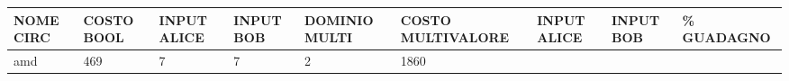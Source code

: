 \documentclass[italian,]{book}
\begin{document}
\begin{longtable}[]{@{}lllllllll@{}}
\toprule
\begin{minipage}[b]{0.07\columnwidth}\raggedright
NOME CIRC\strut
\end{minipage} & \begin{minipage}[b]{0.11\columnwidth}\raggedright
COSTO BOOL\strut
\end{minipage} & \begin{minipage}[b]{0.08\columnwidth}\raggedright
INPUT ALICE\strut
\end{minipage} & \begin{minipage}[b]{0.07\columnwidth}\raggedright
INPUT BOB\strut
\end{minipage} & \begin{minipage}[b]{0.09\columnwidth}\raggedright
DOMINIO MULTI\strut
\end{minipage} & \begin{minipage}[b]{0.12\columnwidth}\raggedright
COSTO MULTIVALORE\strut
\end{minipage} & \begin{minipage}[b]{0.08\columnwidth}\raggedright
INPUT ALICE\strut
\end{minipage} & \begin{minipage}[b]{0.07\columnwidth}\raggedright
INPUT BOB\strut
\end{minipage} & \begin{minipage}[b]{0.07\columnwidth}\raggedright
\% GUADAGNO\strut
\end{minipage}\tabularnewline
\midrule
\endhead
\begin{minipage}[t]{0.07\columnwidth}\raggedright
amd\strut
\end{minipage} & \begin{minipage}[t]{0.11\columnwidth}\raggedright
469\strut
\end{minipage} & \begin{minipage}[t]{0.08\columnwidth}\raggedright
7\strut
\end{minipage} & \begin{minipage}[t]{0.07\columnwidth}\raggedright
7\strut
\end{minipage} & \begin{minipage}[t]{0.09\columnwidth}\raggedright
2\strut
\end{minipage} & \begin{minipage}[t]{0.12\columnwidth}\raggedright
1860\strut
\end{minipage} & \begin{minipage}[t]{0.08\columnwidth}\raggedright

\end{minipage}
\end{longtable}
\end{document}
